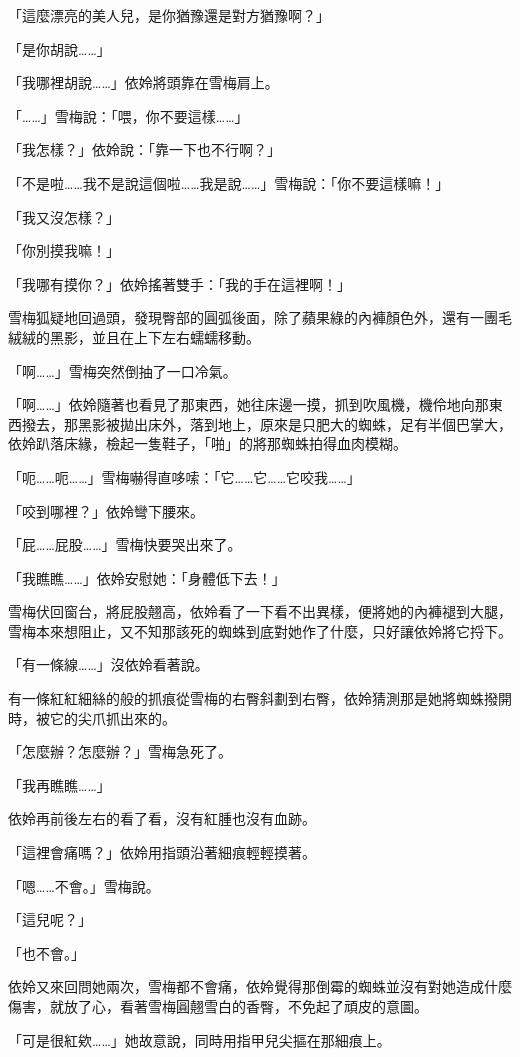 「這麼漂亮的美人兒，是你猶豫還是對方猶豫啊？」

「是你胡說……」

「我哪裡胡說……」依姈將頭靠在雪梅肩上。

「……」雪梅說：「喂，你不要這樣……」

「我怎樣？」依姈說：「靠一下也不行啊？」

「不是啦……我不是說這個啦……我是說……」雪梅說：「你不要這樣嘛！」

「我又沒怎樣？」

「你別摸我嘛！」

「我哪有摸你？」依姈搖著雙手：「我的手在這裡啊！」

雪梅狐疑地回過頭，發現臀部的圓弧後面，除了蘋果綠的內褲顏色外，還有一團毛絨絨的黑影，並且在上下左右蠕蠕移動。

「啊……」雪梅突然倒抽了一口冷氣。

「啊……」依姈隨著也看見了那東西，她往床邊一摸，抓到吹風機，機伶地向那東西撥去，那黑影被拋出床外，落到地上，原來是只肥大的蜘蛛，足有半個巴掌大，依姈趴落床緣，檢起一隻鞋子，「啪」的將那蜘蛛拍得血肉模糊。

「呃……呃……」雪梅嚇得直哆嗦：「它……它……它咬我……」

「咬到哪裡？」依姈彎下腰來。

「屁……屁股……」雪梅快要哭出來了。

「我瞧瞧……」依姈安慰她：「身體低下去！」

雪梅伏回窗台，將屁股翹高，依姈看了一下看不出異樣，便將她的內褲褪到大腿，雪梅本來想阻止，又不知那該死的蜘蛛到底對她作了什麼，只好讓依姈將它捋下。

「有一條線……」沒依姈看著說。

有一條紅紅細絲的般的抓痕從雪梅的右臀斜劃到右臀，依姈猜測那是她將蜘蛛撥開時，被它的尖爪抓出來的。

「怎麼辦？怎麼辦？」雪梅急死了。

「我再瞧瞧……」

依姈再前後左右的看了看，沒有紅腫也沒有血跡。

「這裡會痛嗎？」依姈用指頭沿著細痕輕輕摸著。

「嗯……不會。」雪梅說。

「這兒呢？」

「也不會。」

依姈又來回問她兩次，雪梅都不會痛，依姈覺得那倒霉的蜘蛛並沒有對她造成什麼傷害，就放了心，看著雪梅圓翹雪白的香臀，不免起了頑皮的意圖。

「可是很紅欸……」她故意說，同時用指甲兒尖摳在那細痕上。

